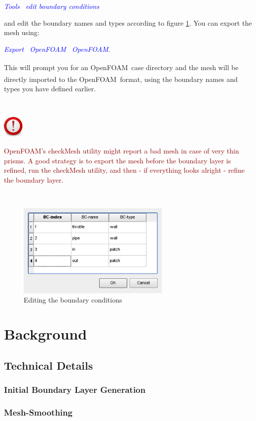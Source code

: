 \documentclass[10pt,a4paper,british]{book}
\newcommand\foam{OpenFOAM\textsuperscript{\textregistered}\ }
\newcommand\arr{\guillemotright\ }
\newcommand\menu[1]{\textcolor{blue}{\it \hspace{5mm} #1}}
\newcommand\important[1]
{
  $~$\\
  \begin{minipage}{15mm}
    \includegraphics[width=1cm]{figures/important}
  \end{minipage}
  \begin{minipage}{110mm}
    \begin{flushleft}
      {\textcolor{darkred}{#1}}
    \end{flushleft}
  \end{minipage}
  \\
  \vspace{3mm}
}
\begin{document}
\menu{Tools \arr edit boundary conditions}

and edit the boundary names and types according to figure \ref{fig:T1_scr10}. You can export the mesh using:

\menu{Export \arr OpenFOAM \arr  OpenFOAM}.

This will prompt you for an \foam case directory and the mesh will be directly imported to the \foam format, using the boundary names and types you have defined earlier.

\important
{
  OpenFOAM's checkMesh utility might report a bad mesh
  in case of very thin prisms. A good strategy is to export the mesh
  before the boundary layer is refined, run the checkMesh utility, and
  then - if everything looks alright - refine the boundary layer.
}
\begin{figure}
  \begin{centering}
    \includegraphics[width=74mm]{figures/tutorials/T1/scr10}
    \par
  \end{centering}
  \caption{Editing the boundary conditions}
  \label{fig:T1_scr10}
\end{figure}

\chapter{Background}

\section{Technical Details}

\subsection{Initial Boundary Layer Generation}

\subsection{Mesh-Smoothing}
\end{document}
